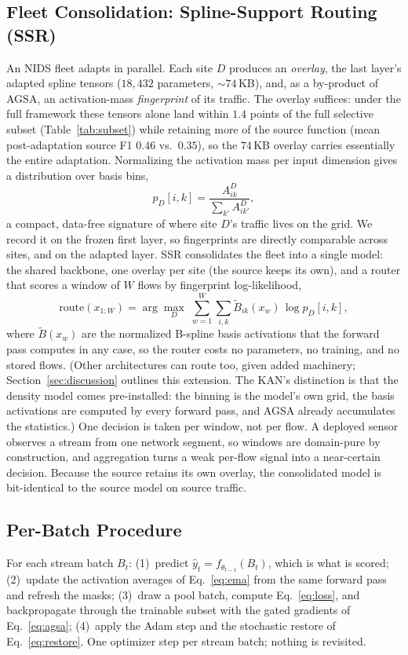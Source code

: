 \documentclass[10pt, conference, letterpaper]{IEEEtran}
\begin{document}
\subsection{Fleet Consolidation: Spline-Support Routing (SSR)}
\label{sec:ssr}
An NIDS fleet adapts in parallel. Each site $D$ produces an
\emph{overlay}, the last layer's adapted spline tensors ($18{,}432$
parameters, ${\sim}74$\,KB), and, as a by-product of AGSA, an
activation-mass \emph{fingerprint} of its traffic. The overlay
suffices: under the full framework these tensors alone land within
$1.4$ points of the full selective subset (Table~\ref{tab:subset})
while retaining more of the source function (mean post-adaptation
source F1 $0.46$ vs.\ $0.35$), so the $74$\,KB overlay carries
essentially the entire adaptation. Normalizing the activation mass per
input dimension gives a distribution over basis bins,
\begin{equation}
p_D[i,k] = \frac{A^{D}_{ik}}{\sum_{k'} A^{D}_{ik'}},
\label{eq:fp}
\end{equation}
a compact, data-free signature of where site $D$'s traffic lives on
the grid. We record it on the frozen first layer, so fingerprints are
directly comparable across sites, and on the adapted layer. SSR
consolidates the fleet into a single model: the shared backbone, one
overlay per site (the source keeps its own), and a router that scores
a window of $W$ flows by fingerprint log-likelihood,
\begin{equation}
\mathrm{route}(x_{1:W})=\arg\max_{D}\;\sum_{w=1}^{W}\sum_{i,k}
\tilde{B}_{ik}(x_w)\,\log p_D[i,k],
\label{eq:ssr}
\end{equation}
where $\tilde{B}(x_w)$ are the normalized B-spline basis activations
that the forward pass computes in any case, so the router costs no
parameters, no training, and no stored flows. (Other architectures can
route too, given added machinery; Section~\ref{sec:discussion}
outlines this extension. The KAN's distinction is that the density model
comes pre-installed: the binning is the model's own grid, the basis
activations are computed by every forward pass, and AGSA already
accumulates the statistics.) One decision is taken per window, not per
flow. A deployed sensor observes a stream from one network segment, so
windows are domain-pure by construction, and aggregation turns a weak
per-flow signal into a near-certain decision. Because the source
retains its own overlay, the consolidated model is bit-identical to
the source model on source traffic.

\subsection{Per-Batch Procedure}
For each stream batch $B_t$: (1)~predict
$\hat{y}_t = f_{\theta_{t-1}}(B_t)$, which is what is scored;
(2)~update the activation averages of Eq.~\eqref{eq:ema} from the same
forward pass and refresh the masks; (3)~draw a pool batch, compute
Eq.~\eqref{eq:loss}, and backpropagate through the trainable subset
with the gated gradients of Eq.~\eqref{eq:agsa}; (4)~apply the Adam
step and the stochastic restore of Eq.~\eqref{eq:restore}. One
optimizer step per stream batch; nothing is revisited.
\end{document}
